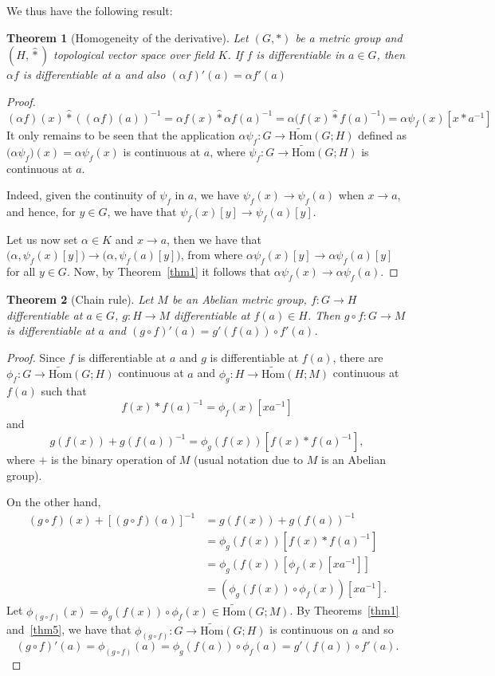 \documentclass{article}
\newtheorem{theorem}{Theorem}[section]
\numberwithin{theorem}{section}
\numberwithin{equation}{section}
\begin{document}
We thus have the following result:

\begin{theorem}[Homogeneity of the derivative]\label{thm8}
Let $(G, \ast)$ be a metric group and $(H, \hat{\ast})$ topological vector space over field $K$. If $f$ is differentiable in $a \in G$, then $\alpha f$ is differentiable at $a$ and also $(\alpha f)'(a) = \alpha f'(a)$
\end{theorem}
\begin{proof}
\[
(\alpha f)(x) \hat{\ast} ((\alpha f)(a))^{-1} = \alpha f(x) \hat{\ast} \alpha f(a)^{-1} = \alpha \bigl( f(x) \hat{\ast} f(a)^{-1} \bigr) = \alpha \psi_f(x)[x \ast a^{-1}]
\]
It only remains to be seen that the application $\alpha \psi_f : G \to \tilde{\mathrm{Hom}}(G; H)$ defined as $\bigl( \alpha \psi_f \bigr)(x) = \alpha \psi_f(x)$ is continuous at $a$, where $\psi_f : G \to \tilde{\mathrm{Hom}}(G; H)$ is continuous at $a$.

Indeed, given the continuity of $\psi_f$ in $a$, we have $\psi_f(x) \to \psi_f(a)$ when $x \to a$, and hence, for $y \in G$, we have that $\psi_f(x)[y] \to \psi_f(a)[y]$.

Let us now set $\alpha \in K$ and $x \to a$, then we have that $\bigl( \alpha, \psi_f(x)[y] \bigr) \to \bigl( \alpha, \psi_f(a)[y] \bigr)$, from where $\alpha \psi_f(x)[y] \to \alpha \psi_f(a)[y]$ for all $y \in G$. Now, by Theorem~\ref{thm1} it follows that $\alpha \psi_f(x) \to \alpha \psi_f(a)$.
\end{proof}

\begin{theorem}[Chain rule]\label{thm9}
Let $M$ be an Abelian metric group, $f : G \to H$ differentiable at $a \in G$, $g : H \to M$ differentiable at $f(a) \in H$. Then $g \circ f : G \to M$ is differentiable at $a$ and $(g \circ f)'(a) = g'(f(a)) \circ f'(a)$.
\end{theorem}
\begin{proof}
Since $f$ is differentiable at $a$ and $g$ is differentiable at $f(a)$, there are $\phi_f : G \to \tilde{\mathrm{Hom}}(G; H)$ continuous at $a$ and $\phi_g : H \to \tilde{\mathrm{Hom}}(H; M)$ continuous at $f(a)$ such that
\[
f(x) \ast f(a)^{-1} = \phi_f(x)[x a^{-1}]
\]
and
\[
g(f(x)) + g(f(a))^{-1} = \phi_g(f(x))[f(x) \ast f(a)^{-1}],
\]
where $+$ is the binary operation of $M$ (usual notation due to $M$ is an Abelian group).

On the other hand,
\begin{align*}
(g \circ f)(x) + [(g \circ f)(a)]^{-1} &= g(f(x)) + g(f(a))^{-1}\\
&= \phi_g(f(x))[f(x) \ast f(a)^{-1}]\\
&= \phi_g(f(x))[\phi_f(x)[x a^{-1}]]\\
&= (\phi_g(f(x)) \circ \phi_f(x))[x a^{-1}].
\end{align*}
Let $\phi_{(g\circ f)}(x) = \phi_g(f(x)) \circ \phi_f(x) \in \tilde{\mathrm{Hom}}(G; M)$. By Theorems~\ref{thm1} and~\ref{thm5}, we have that $\phi_{(g\circ f)} : G \to \tilde{\mathrm{Hom}}(G; H)$ is continuous on $a$ and so
\[
(g \circ f)'(a) = \phi_{(g\circ f)}(a) = \phi_g(f(a)) \circ \phi_f(a) = g'(f(a)) \circ f'(a).
\]
\end{proof}
\end{document}

